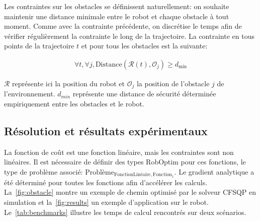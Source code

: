 Les contraintes sur les obstacles se définissent naturellement: on
souhaite maintenir une distance minimale entre le robot et chaque
obstacle à tout moment. Comme avec la contrainte précédente, on
discrétise le temps afin de vérifier régulièrement la contrainte le
long de la trajectoire. La contrainte en tous points de la trajectoire
$t$ et pour tous les obstacles est la suivante:

\begin{eqnarray}
\forall t, \forall j, \text{Distance}(\mathcal{R}(t), \mathcal{O}_j) \geq d_{\min}
\end{eqnarray}

$\mathcal{R}$ représente ici la position du robot et $\mathcal{O}_j$
la position de l'obstacle $j$ de l'environnement. $d_{min}$ représente
une distance de sécurité déterminée empiriquement entre les obstacles
et le robot.


\subsection{Résolution et résultats expérimentaux}
\label{sec:chap1_roboptim_resultats}


La fonction de coût est une fonction linéaire, mais les contraintes
sont non linéaires. Il est nécessaire de définir des types RobOptim
pour ces fonctions, le type de problème associé:
$\text{Problème}_{\text{FonctionLinéaire}, \text{Fonction}_1}$. Le
gradient analytique a été déterminé pour toutes les fonctions afin
d'accélérer les calculs. La \autoref{fig:obstacle} montre
un exemple de chemin optimisé par le solveur CFSQP en simulation et
la \autoref{fig:results} un exemple d'application sur le
robot. Le \autoref{tab:benchmarks} illustre les temps de calcul
rencontrés sur deux scénarios.


